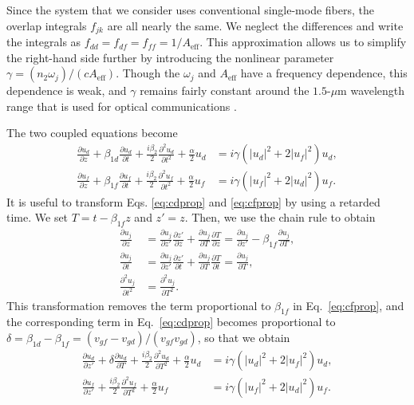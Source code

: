 %
Since the system that we consider uses conventional single-mode fibers, the overlap integrals $f_{jk}$ are all nearly the same. We neglect the differences and write the integrals as $f_{dd} = f_{df} = f_{ff} = 1/A_{\text{eff}}$. This approximation allows us to simplify the right-hand side further by introducing the nonlinear parameter $\gamma = (n_2\omega_j)/(cA_{\text{eff}})$. Though the $\omega_j$ and $A_{\text{eff}}$ have a frequency dependence, this dependence is weak, and $\gamma$ remains fairly constant around the $1.5$-$\mu$m wavelength range that is used for optical communications \cite{Agrawal2013}.

The two coupled equations become
%
\begin{subequations}
\begin{align}
\frac{\partial u_d}{\partial z} + \beta_{1d}\frac{\partial u_d}{\partial t} + \frac{i\beta_{2}}{2}\frac{\partial^2 u_d}{\partial t^2} + \frac{\alpha}{2}u_d &= i\gamma\left(|u_d|^2 + 2|u_f|^2\right)u_d, \label{eq:cdprop} \\
\frac{\partial u_f}{\partial z} + \beta_{1f}\frac{\partial u_f}{\partial t} + \frac{i\beta_{2}}{2}\frac{\partial^2 u_f}{\partial t^2} + \frac{\alpha}{2}u_f &= i\gamma\left(|u_f|^2 + 2|u_d|^2\right)u_f. \label{eq:cfprop}
\end{align}
\end{subequations}
%
It is useful to transform Eqs. \ref{eq:cdprop} and \ref{eq:cfprop} by using a retarded time. We set $T = t - \beta_{1f}z$ and $z' = z$. Then, we use the chain rule to obtain
%
\begin{subequations}
\begin{align}
\frac{\partial u_j}{\partial z} &= \frac{\partial u_j}{\partial z'}\frac{\partial z'}{\partial z} + \frac{\partial u_j}{\partial T}\frac{\partial T}{\partial z} =  \frac{\partial u_j}{\partial z'} - \beta_{1f}\frac{\partial u_j}{\partial T}, \\
\frac{\partial u_j}{\partial t} &= \frac{\partial u_j}{\partial z'}\frac{\partial z'}{\partial t} + \frac{\partial u_j}{\partial T}\frac{\partial T}{\partial t} =  \frac{\partial u_j}{\partial T}, \\
\frac{\partial^2 u_j}{\partial t^2} &= \frac{\partial^2 u_j}{\partial T^2}.
\end{align}
\end{subequations}
%
This transformation removes the term proportional to $\beta_{1f}$ in Eq.~\ref{eq:cfprop}, and the corresponding term in Eq.~\ref{eq:cdprop} becomes proportional to $\delta = \beta_{1d} - \beta_{1f} = (v_{gf} - v_{gd})/(v_{gf}v_{gd})$, so that we obtain
%
\begin{subequations}
\begin{align}
\frac{\partial u_d}{\partial z'} + \delta\frac{\partial u_d}{\partial T} + \frac{i\beta_{2}}{2}\frac{\partial^2 u_d}{\partial T^2} + \frac{\alpha}{2}u_d &= i\gamma\left(|u_d|^2 + 2|u_f|^2\right)u_d, \label{eq:dataprop} \\
\frac{\partial u_f}{\partial z'} + \frac{i\beta_{2}}{2}\frac{\partial^2 u_f}{\partial T^2} + \frac{\alpha}{2}u_f &= i\gamma\left(|u_f|^2 + 2|u_d|^2\right)u_f. \label{eq:freqprop}
\end{align}
\end{subequations}
%

